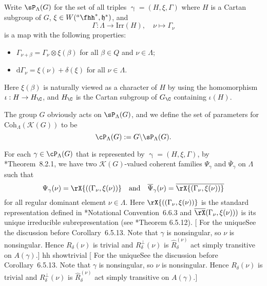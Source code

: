 \documentclass[12pt]{amsart}
\newcommand{\trivial}[2][]{\if\relax\detokenize{#1}\relax
  {%
      \color{orange} \vspace{0em}$[$#2$]$
      \color{black}
  }
  \else
\ifx#1h
\ifcsname showtrivial\endcsname
{%
    \color{orange}\vspace{0em}$[$#2$]$
    \color{black}
}
\fi
\else {\red Wrong argument!} \fi
\fi
}
\def\subset{\subseteq}
\newcommand{\CK}{{\mathcal {K}}}
\newcommand{\g}{\mathfrak g}
\newcommand{\h}{\mathfrak h}
\numberwithin{equation}{section}
\theoremstyle{remark}
\def\Irr{\mathrm{Irr}}
\def\hha{{}^a\fhh}
\def\AND{\quad \text{and} \quad}
\def\Coh{\mathrm{Coh}}
\begin{document}

Write $\sP_{\Lambda}(G)$ for the set of all triples $\upgamma=(H, \xi, \Gamma)$ where $H$ is a Cartan subgroup of $G$, $\xi\in  W(\hha^*, \h^*)$, and
\[
\Gamma:   \Lambda\rightarrow \Irr(H), \quad \nu\mapsto \Gamma_\nu
\]
 is a map
with the following properties:
\begin{itemize}
  \item $\Gamma_{\nu+\beta}=\Gamma_\nu\otimes \xi(\beta)$ for all $\beta\in Q$ and $\nu\in \Lambda$;
  \item $\mathrm d\Gamma_\nu = \xi(\nu)+\delta(\xi)$ for all $\nu\in  \Lambda$.
  \end{itemize}
Here $\xi(\beta)$ is naturally viewed as a character of $H$ by using the homomorphism $\iota: H\rightarrow H_\C$, and $H_\C$ is the Cartan subgroup of $G_\C$ containing $\iota(H)$.


\def\olgamma{\overline\gamma}
\def\olPsi{\overline\Psi}
\def\olrX{\overline\rX}

The group $G$ obviously acts on $\sP_{\Lambda}(G)$,
and we define the set of parameters  for $\Coh_{\Lambda}(\CK(G))$
to be
\begin{equation}\label{eq:Pram}
  \cP_{\Lambda}(G) := G\backslash  \sP_{\Lambda}(G).
\end{equation}



For each $\gamma \in\cP_{\Lambda}(G)$ that is represented by $\upgamma=(H, \xi, \Gamma)$, by \cite{Vg}*{Theorem~8.2.1}, we  have two $\CK(G)$-valued coherent families  $\Psi_{\gamma}$ and $\olPsi_{\gamma}$ on $\Lambda$  such that
\begin{equation}\label{eq:psigamma}
  \Psi_{\gamma}(\nu)=\rX{((\Gamma_\nu,\xi(\nu))}
  \AND
  \olPsi_{\gamma}(\nu)=\olrX{(\Gamma_\nu,\xi(\nu))}
\end{equation}
for all  regular dominant element $\nu\in \Lambda$.
Here $\rX{((\Gamma_\nu,\xi(\nu))}$ is the standard representation defined in \cite{Vg}*{Notational Convention~6.6.3}
  and  $\olrX(\Gamma_\nu,\xi(\nu)))$ is its unique irreducible subrepresentation (see \cite{Vg}*{Theorem 6.5.12}).
  \trivial[h]{ For the uniqueSee the discussion before Corollary~6.5.13. Note that $\gamma$ is nonsingular, so $\nu$ is nonsingular.  Hence $R_\delta(\nu)$ is trivial and $R_\delta^\perp(\nu)$ is $\hat R_\delta^(\nu)$ act simply transitive on $A(\gamma)$.}
\end{document}
